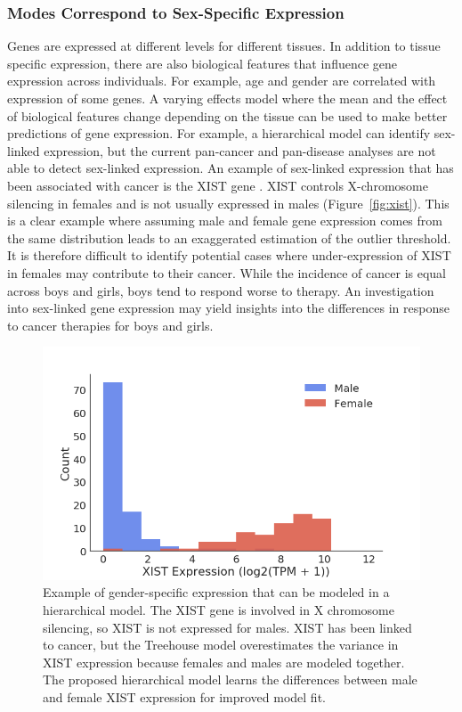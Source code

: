 \documentclass[fleqn,10pt]{wlscirep}
\newcommand{\figref}[1]{Figure~\ref{fig:#1}}
\begin{document}
\subsubsection*{Modes Correspond to Sex-Specific Expression}
Genes are expressed at different levels for different tissues. In addition to tissue specific expression, there are also biological features that influence gene expression across individuals. For example, age and gender are correlated with expression of some genes. A varying effects model where the mean and the effect of biological features change depending on the tissue can be used to make better predictions of gene expression. For example, a hierarchical model can identify sex-linked expression, but the current pan-cancer and pan-disease analyses are not able to detect sex-linked expression. An example of sex-linked expression that has been associated with cancer is the XIST gene \cite{yildirim2013xist}. XIST controls X-chromosome silencing in females and is not usually expressed in males (\figref{xist}). This is a clear example where assuming male and female gene expression comes from the same distribution leads to an exaggerated estimation of the outlier threshold. It is therefore difficult to identify potential cases where under-expression of XIST in females may contribute to their cancer. While the incidence of cancer is equal across boys and girls, boys tend to respond worse to therapy. An investigation into sex-linked gene expression may yield insights into the differences in response to cancer therapies for boys and girls. 


\begin{figure}
\centering
\includegraphics[width=0.75\linewidth]{images/xist-fig-2017-12-28.png}
\caption{Example of gender-specific expression that can be modeled in a hierarchical model. The XIST gene is involved in X chromosome silencing, so XIST is not expressed for males. XIST has been linked to cancer, but the Treehouse model overestimates the variance in XIST expression because females and males are modeled together. The proposed hierarchical model learns the differences between male and female XIST expression for improved model fit.}
\label{sfig:xist}
\end{figure}
\end{document}
